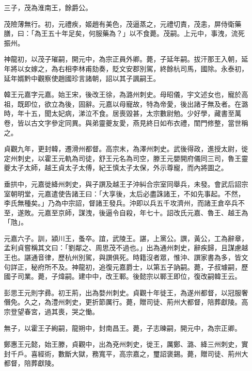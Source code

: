 \begin{pinyinscope}
 三子，茂為淮南王，餘爵公。



 茂險薄無行。初，元禮疾，姬趙有美色，茂逼蒸之，元禮切責，茂恚，屏侍衛藥膳，曰：「為王五十年足矣，何服藥為？」以不食薨。茂嗣。上元中，事洩，流死振州。



 神龍初，以茂子璀嗣，開元中，為宗正員外卿。薨，子延年嗣。拔汗那王入朝，延年將以女嫁之，為右相李林甫劾奏，貶文安郡別駕，終餘杭司馬，國除。永泰初，延年婿黔中觀察使趙國珍言諸朝，詔以其子諷嗣王。



 韓王元嘉字元嘉。始王宋，後改王徐，為潞州刺史。母昭儀，宇文述女也，寵於高祖，既即位，欲立為後，固辭。元嘉以母寵故，特為帝愛，後出諸子無及者。在潞時，年十五，聞太妃病，涕泣不食。居喪毀甚，太宗數尉勉。少好學，藏書至萬卷，皆以古文字參定同異。與弟靈夔友愛，燕見終日如布衣禮，閨門修整，當世稱之。



 貞觀九年，更封韓，遷滑州都督。高宗末，為澤州刺史。武後得政，進授太尉，徙定州刺史，以霍王元軌為司徒，舒王元名為司空，滕王元嬰開府儀同三司，魯王靈夔太子太師，越王貞太子太傅，紀王慎太子太保，外示尊寵，而內將圖之。



 垂拱中，元嘉徙絳州刺史，與子譔及越王子沖糾合宗室同舉兵，未發。會武后詔宗室朝明堂，元嘉遣使告諸王曰：「大享後，太后必盡誅諸王，不如先事起。不然，李氏無種矣。」乃為中宗詔，督諸王發兵。沖即以兵五千攻濟州，而諸王倉卒兵不至，遂敗。元嘉至京師，謀洩，後逼令自殺，年七十。詔改氏元嘉、魯王、越王為「虺」。



 元嘉六子。訓，潁川王，蚤卒。誼，武陵王。諶，上黨公。譔，黃公，工為辭章，孟利貞嘗稱其文曰：「劉鄰之、周思茂不過也。」出為通州刺史，辭疾歸，且謀慮越王也。諶通音律，歷杭州別駕，與譔俱死。時籍沒者眾，惟沖、譔家書為多，皆文句詳正，秘府所不及。神龍初，追復元嘉爵士，以第五子訥嗣。薨，子叔璩嗣，歷國子司業。薨，子煒嗣。建中中，改王鄆。後懿宗以鄆王即位，復改嗣韓王云。



 彭思王元則字彞。初王荊，出為婺州刺史。貞觀十年徙王，為遂州都督，以冠服奢僭免。久之，為澧州刺史，更折節厲行。薨，贈司徒、荊州大都督，陪葬獻陵。高宗登望春宮，過其喪，哭之慟。



 無子，以霍王子絢嗣，龍朔中，封南昌王。薨，子志暕嗣，開元中，為宗正卿。



 鄭惠王元懿，始王滕，貞觀中，出為兗州刺史，徙王，厲鄭、潞、絳三州刺史，實封千戶。喜經術，數斷大獄，務寬平，高宗嘉之，璽詔褒錫。薨，贈司徒、荊州大都督，陪葬獻陵。




\end{pinyinscope}
